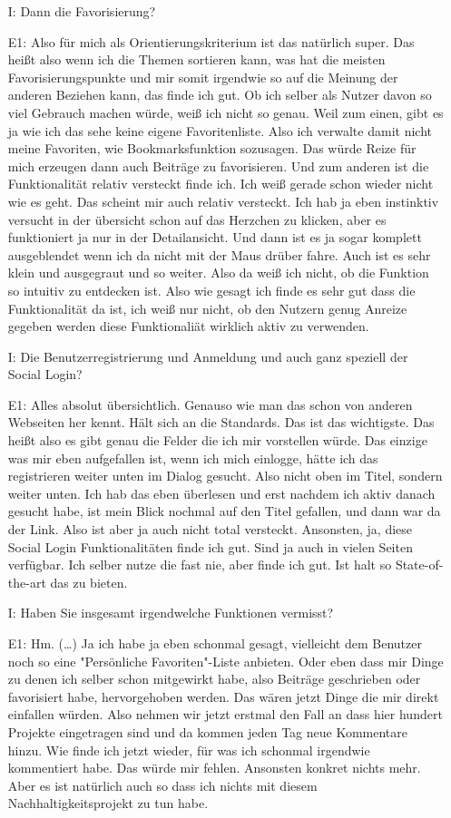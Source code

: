 \begin{itemize}
    \item[I:] Dann die Favorisierung?
    \item[E1:] Also f{\"u}r mich als Orientierungskriterium ist das nat{\"u}rlich super. Das hei{\ss}t also wenn ich die Themen sortieren kann, was hat die meisten Favorisierungspunkte und mir somit irgendwie so auf die Meinung der anderen Beziehen kann, das finde ich gut. Ob ich selber als Nutzer davon so viel Gebrauch machen w{\"u}rde, wei{\ss} ich nicht so genau. Weil zum einen, gibt es ja wie ich das sehe keine eigene Favoritenliste. Also ich verwalte damit nicht meine Favoriten, wie Bookmarksfunktion sozusagen. Das w{\"u}rde Reize f{\"u}r mich erzeugen dann auch Beitr{\"a}ge zu favorisieren. Und zum anderen ist die Funktionalit{\"a}t relativ versteckt finde ich. Ich wei{\ss} gerade schon wieder nicht wie es geht. Das scheint mir auch relativ versteckt. Ich hab ja eben instinktiv versucht in der {\"u}bersicht schon auf das Herzchen zu klicken, aber es funktioniert ja nur in der Detailansicht. Und dann ist es ja sogar komplett ausgeblendet wenn ich da nicht mit der Maus dr{\"u}ber fahre. Auch ist es sehr klein und ausgegraut und so weiter. Also da wei{\ss} ich nicht, ob die Funktion so intuitiv zu entdecken ist. Also wie gesagt ich finde es sehr gut dass die Funktionalit{\"a}t da ist, ich wei{\ss} nur nicht, ob den Nutzern genug Anreize gegeben werden diese Funktionali{\"a}t wirklich aktiv zu verwenden.
    \item[I:] Die Benutzerregistrierung und Anmeldung und auch ganz speziell der Social Login?
    \item[E1:] Alles absolut {\"u}bersichtlich. Genauso wie man das schon von anderen Webseiten her kennt. H{\"a}lt sich an die Standards. Das ist das wichtigste. Das hei{\ss}t also es gibt genau die Felder die ich mir vorstellen w{\"u}rde. Das einzige was mir eben aufgefallen ist, wenn ich mich einlogge, h{\"a}tte ich das registrieren weiter unten im Dialog gesucht. Also nicht oben im Titel, sondern weiter unten. Ich hab das eben {\"u}berlesen und erst nachdem ich aktiv danach gesucht habe, ist mein Blick nochmal auf den Titel gefallen, und dann war da der Link. Also ist aber ja auch nicht total versteckt. Ansonsten, ja, diese Social Login Funktionalit{\"a}ten finde ich gut. Sind ja auch in vielen Seiten verf{\"u}gbar. Ich selber nutze die fast nie, aber finde ich gut. Ist halt so State-of-the-art das zu bieten.
    \item[I:] Haben Sie insgesamt irgendwelche Funktionen vermisst?
    \item[E1:] Hm. (\dots) Ja ich habe ja eben schonmal gesagt, vielleicht dem Benutzer noch so eine "Pers{\"o}nliche Favoriten"-Liste anbieten. Oder eben dass mir Dinge zu denen ich selber schon mitgewirkt habe, also Beitr{\"a}ge geschrieben oder favorisiert habe, hervorgehoben werden. Das w{\"a}ren jetzt Dinge die mir direkt einfallen w{\"u}rden. Also nehmen wir jetzt erstmal den Fall an dass hier hundert Projekte eingetragen sind und da kommen jeden Tag neue Kommentare hinzu. Wie finde ich jetzt wieder, f{\"u}r was ich schonmal irgendwie kommentiert habe. Das w{\"u}rde mir fehlen. Ansonsten konkret nichts mehr. Aber es ist nat{\"u}rlich auch so dass ich nichts mit diesem Nachhaltigkeitsprojekt zu tun habe.

\end{itemize}
